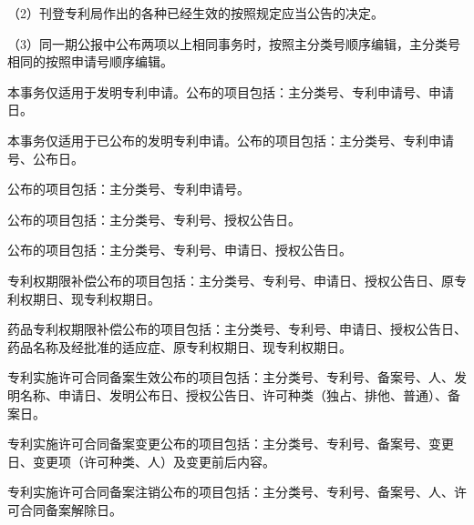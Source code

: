 {\setlength{\parindent}{17.1bp}（2）刊登专利局作出的各种已经生效的按照规定应当公告的决定。\par}

{\setlength{\parindent}{17.1bp}（3）同一期公报中公布两项以上相同事务时，按照主分类号顺序编辑，主分类号相同的按照申请号顺序编辑。\par}

本事务仅适用于发明专利申请。公布的项目包括：主分类号、专利申请号、申请日。

本事务仅适用于已公布的发明专利申请。公布的项目包括：主分类号、专利申请号、公布日。

公布的项目包括：主分类号、专利申请号。

公布的项目包括：主分类号、专利号、授权公告日。

公布的项目包括：主分类号、专利号、申请日、授权公告日。

专利权期限补偿公布的项目包括：主分类号、专利号、申请日、授权公告日、原专利权期日、现专利权期日。

药品专利权期限补偿公布的项目包括：主分类号、专利号、申请日、授权公告日、药品名称及经批准的适应症、原专利权期日、现专利权期日。

{\setlength{\parindent}{22.7bp}专利实施许可合同备案生效公布的项目包括：主分类号、专利号、备案号、人、发明名称、申请日、发明公布日、授权公告日、许可种类（独占、排他、普通）、备案日。\par}

{\setlength{\parindent}{22.7bp}专利实施许可合同备案变更公布的项目包括：主分类号、专利号、备案号、变更日、变更项（许可种类、人）及变更前后内容。\par}

{\setlength{\parindent}{22.7bp}专利实施许可合同备案注销公布的项目包括：主分类号、专利号、备案号、人、许可合同备案解除日。\par}

